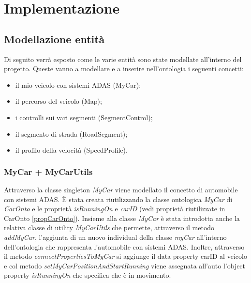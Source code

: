 \chapter{Implementazione}

\section{Modellazione entit\`a}\label{modellazione}
Di seguito verr\`a esposto come le varie entit\`a sono state modellate all'interno del progetto.
Queste vanno a modellare e a inserire nell'ontologia i seguenti concetti:
\begin{itemize}
\item il mio veicolo con sistemi ADAS (MyCar);
\item il percorso del veicolo (Map);
\item i controlli sui vari segmenti (SegmentControl);
\item il segmento di strada (RoadSegment);
\item il profilo della velocit\`a (SpeedProfile).
\end{itemize}
\subsection{MyCar + MyCarUtils}
Attraverso la classe singleton \textit{MyCar} viene modellato il concetto di automobile con sistemi ADAS. \`E stata creata riutilizzando la classe ontologica \textit{MyCar} di \textit{CarOnto} e le propriet\`a \textit{isRunningOn} e \textit{carID} (vedi propriet\`a riutilizzate in CarOnto \ref{propCarOnto}).
Insieme alla classe \textit{MyCar} \`e stata introdotta anche la relativa classe di utility \textit{MyCarUtils} che permette, attraverso il metodo \textit{addMyCar}, l'aggiunta di un nuovo individual della classe \textit{myCar} all'interno dell'ontologia che rappresenta l'automobile con sistemi ADAS.
Inoltre, attraverso il metodo \textit{connectPropertiesToMyCar} si aggiunge il data property carID al veicolo e col metodo \textit{setMyCarPositionAndStartRunning} viene assegnata all'auto l'object property \textit{isRunningOn} che specifica che \`e in movimento.
